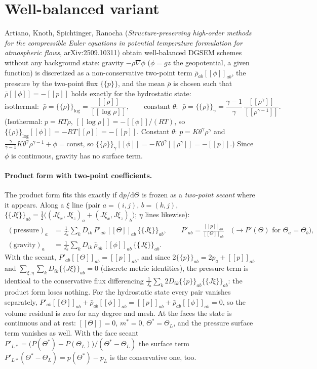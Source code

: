 \documentclass[11pt,a4paper]{article}
\newcommand{\avg}[1]{\{\!\{#1\}\!\}}
\newcommand{\jump}[1]{[\![#1]\!]}
\begin{document}
\section{Well-balanced variant}\label{sec:wb}
Artiano, Knoth, Spichtinger, Ranocha (\emph{Structure-preserving high-order methods for the
compressible Euler equations in potential temperature formulation for atmospheric flows},
arXiv:2509.10311) obtain well-balanced DGSEM schemes without any background state: gravity
$-\rho\nabla\phi$ ($\phi=gz$ the geopotential, a given function) is discretized as a
non-conservative two-point term $\bar\rho_{ab}\jump{\phi}_{ab}$, the pressure by the two-point flux
$\avg p$, and the mean $\bar\rho$ is chosen such that $\bar\rho\jump\phi=-\jump p$ holds exactly for the
hydrostatic state:
\[
\text{isothermal: }\ \bar\rho=\avg\rho_{\log}=\frac{\jump\rho}{\jump{\log\rho}},\qquad
\text{constant }\theta:\ \ \bar\rho=\avg\rho_\gamma=\frac{\gamma-1}{\gamma}\,
\frac{\jump{\rho^\gamma}}{\jump{\rho^{\gamma-1}}}.
\]
(Isothermal: $p=RT\rho$, $\jump{\log\rho}=-\jump\phi/(RT)$, so $\avg\rho_{\log}\jump\phi=-RT\jump\rho=-\jump p$.
Constant $\theta$: $p=K\theta^\gamma\rho^\gamma$ and $\tfrac{\gamma}{\gamma-1}K\theta^\gamma\rho^{\gamma-1}+\phi=\mathrm{const}$,
so $\avg\rho_\gamma\jump\phi=-K\theta^\gamma\jump{\rho^\gamma}=-\jump p$.) Since $\phi$ is continuous, gravity has no
surface term.

\paragraph{Product form with two-point coefficients.} The product form fits this exactly if $\mathrm dp/\mathrm d\Theta$
is frozen as a \emph{two-point secant} where it appears. Along a $\xi$ line (pair $a=(i,j)$, $b=(k,j)$,
$\avg{J\xi}_{ab}=\tfrac12\big((J\xi_x,J\xi_z)_a+(J\xi_x,J\xi_z)_b\big)$; $\eta$ lines likewise):
\begin{align*}
(\text{pressure})_a&=\frac1{J_a}\sum_k D_{ik}\,P'_{ab}\,\jump{\Theta}_{ab}\,\avg{J\xi}_{ab},\qquad
P'_{ab}=\frac{\jump p_{ab}}{\jump\Theta_{ab}}\quad\big(\to P'(\Theta)\text{ for }\Theta_a=\Theta_b\big),\\
(\text{gravity})_a&=\frac1{J_a}\sum_k D_{ik}\,\bar\rho_{ab}\,\jump{\phi}_{ab}\,\avg{J\xi}_{ab}.
\end{align*}
With the secant, $P'_{ab}\jump\Theta_{ab}=\jump p_{ab}$, and since $2\avg p_{ab}=2p_a+\jump p_{ab}$ and
$\sum_{\xi,\eta}\sum_kD_{ik}\avg{J\xi}_{ab}=0$ (discrete metric identities), the pressure term is identical to the
conservative flux differencing $\frac1{J_a}\sum_k2D_{ik}\avg p_{ab}\avg{J\xi}_{ab}$: the product form loses nothing.
For the hydrostatic state every pair vanishes separately, $P'_{ab}\jump\Theta_{ab}+\bar\rho_{ab}\jump\phi_{ab}
=\jump p_{ab}+\bar\rho_{ab}\jump\phi_{ab}=0$, so the volume residual is zero for any degree and mesh. At the faces
the state is continuous and at rest: $\jump\Theta=0$, $m^*=0$, $\Theta^*=\Theta_L$, and the pressure surface term
vanishes as well. With the face secant $P'_{L*}=\big(P(\Theta^*)-P(\Theta_L)\big)/(\Theta^*-\Theta_L)$ the surface term
$P'_{L*}(\Theta^*-\Theta_L)=p(\Theta^*)-p_L$ is the conservative one, too.
\end{document}
